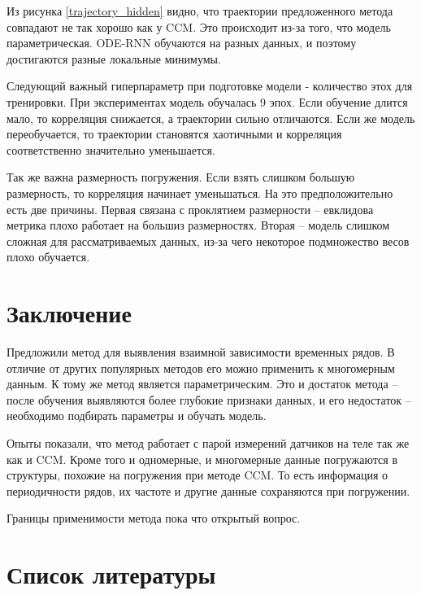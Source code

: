 \documentclass[12pt, twoside]{article}
\begin{document}
Из рисунка \ref{trajectory_hidden} видно, что траектории предложенного метода совпадают не так хорошо как у CCM. Это происходит из-за того, что модель параметрическая. ODE-RNN обучаются на разных данных, и поэтому достигаются разные локальные минимумы. 

Следующий важный гиперпараметр при подготовке модели - количество этох для тренировки. При экспериментах модель обучалась 9 эпох. Если обучение длится мало, то корреляция снижается, а траектории сильно отличаются. Если же модель переобучается, то траектории становятся хаотичными и корреляция соответственно значительно уменьшается.

Так же важна размерность погружения. Если взять слишком большую размерность, то корреляция начинает уменьшаться. На это предположительно есть две причины. Первая связана с проклятием размерности -- евклидова метрика плохо работает на большиз размерностях. Вторая -- модель слишком сложная для рассматриваемых данных, из-за чего некоторое подмножество весов плохо обучается.

\section{Заключение}

Предложили метод для выявления взаимной зависимости временных рядов.  В отличие от других популярных методов его можно применить к многомерным данным. К тому же метод является параметрическим. Это и достаток метода -- после обучения выявляются более глубокие признаки данных, и его недостаток -- необходимо подбирать параметры и обучать модель.

   Опыты показали, что метод работает с парой измерений датчиков на теле так же как и CCM. Кроме того и одномерные, и многомерные данные погружаются в структуры, похожие на погружения при методе CCM. То есть информация о периодичности рядов, их частоте и другие данные сохраняются при погружении.
   
   Границы применимости метода пока что открытый вопрос.


\section{Список литературы}




\newpage
\end{document}
